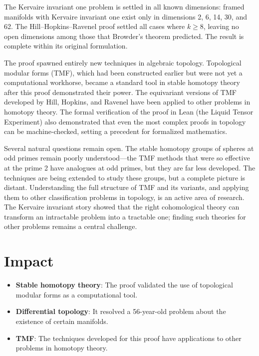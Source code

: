 The Kervaire invariant one problem is settled in all known dimensions: framed manifolds with Kervaire invariant one exist only in dimensions 2, 6, 14, 30, and 62. The Hill--Hopkins--Ravenel proof settled all cases where $k \ge 8$, leaving no open dimensions among those that Browder's theorem predicted. The result is complete within its original formulation.

The proof spawned entirely new techniques in algebraic topology. Topological modular forms (TMF), which had been constructed earlier but were not yet a computational workhorse, became a standard tool in stable homotopy theory after this proof demonstrated their power. The equivariant versions of TMF developed by Hill, Hopkins, and Ravenel have been applied to other problems in homotopy theory. The formal verification of the proof in Lean (the Liquid Tensor Experiment) also demonstrated that even the most complex proofs in topology can be machine-checked, setting a precedent for formalized mathematics.

Several natural questions remain open. The stable homotopy groups of spheres at odd primes remain poorly understood---the TMF methods that were so effective at the prime 2 have analogues at odd primes, but they are far less developed. The techniques are being extended to study these groups, but a complete picture is distant. Understanding the full structure of TMF and its variants, and applying them to other classification problems in topology, is an active area of research. The Kervaire invariant story showed that the right cohomological theory can transform an intractable problem into a tractable one; finding such theories for other problems remains a central challenge.

\section{Impact}

\begin{itemize}
\item \textbf{Stable homotopy theory}: The proof validated the use of topological modular forms as a computational tool.
\item \textbf{Differential topology}: It resolved a 56-year-old problem about the existence of certain manifolds.
\item \textbf{TMF}: The techniques developed for this proof have applications to other problems in homotopy theory.
\end{itemize}

